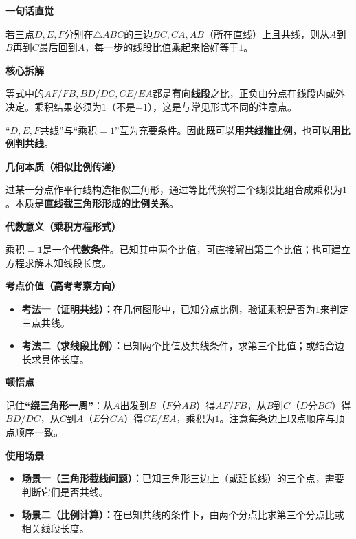 \begin{explanationbox}
	\textbf{\textcolor{CExplanation}{一句话直觉}}

	若三点$D,E,F$分别在$\triangle ABC$的三边$BC,CA,AB$（所在直线）上且共线，则从$A$到$B$再到$C$最后回到$A$，每一步的线段比值乘起来恰好等于$1$。

	\medskip
	\textbf{\textcolor{CExplanation}{核心拆解}}
	\begin{description}[style=nextline, leftmargin=2.8em, labelsep=0.5em, itemsep=0.45em]
		\item[\textbf{要点一（有向比例乘积）：}] 等式中的$AF/FB,BD/DC,CE/EA$都是\textbf{有向线段}之比，正负由分点在线段内或外决定。乘积结果必须为$1$（不是$-1$），这是与常见形式不同的注意点。
		\item[\textbf{要点二（充要关系）：}] “$D,E,F$共线”与“乘积$=1$”互为充要条件。因此既可以\textbf{用共线推比例}，也可以\textbf{用比例判共线}。
	\end{description}

	\medskip
	\textbf{\textcolor{CExplanation}{几何本质（相似比例传递）}}

	过某一分点作平行线构造相似三角形，通过等比代换将三个线段比组合成乘积为$1$。本质是\textbf{直线截三角形形成的比例关系}。

	\medskip
	\textbf{\textcolor{CExplanation}{代数意义（乘积方程形式）}}

	乘积$=1$是一个\textbf{代数条件}。已知其中两个比值，可直接解出第三个比值；也可建立方程求解未知线段长度。

	\medskip
	\textbf{\textcolor{CExplanation}{考点价值（高考考察方向）}}
	\begin{itemize}[leftmargin=*, itemsep=0.5em, topsep=0.4em]
		\item \textbf{考法一（证明共线）：}在几何图形中，已知分点比例，验证乘积是否为$1$来判定三点共线。
		\item \textbf{考法二（求线段比例）：}已知两个比值及共线条件，求第三个比值；或结合边长求具体长度。
	\end{itemize}

	\medskip
	\textbf{\textcolor{CExplanation}{顿悟点}}

	记住\textbf{“绕三角形一周”}：从$A$出发到$B$（$F$分$AB$）得$AF/FB$，从$B$到$C$（$D$分$BC$）得$BD/DC$，从$C$到$A$（$E$分$CA$）得$CE/EA$，乘积为$1$。注意每条边上取点顺序与顶点顺序一致。

	\medskip
	\textbf{\textcolor{CExplanation}{使用场景}}
	\begin{itemize}[leftmargin=*, itemsep=0.5em, topsep=0.4em]
		\item \textbf{场景一（三角形截线问题）：}已知三角形三边上（或延长线）的三个点，需要判断它们是否共线。
		\item \textbf{场景二（比例计算）：}在已知共线的条件下，由两个分点比求第三个分点比或相关线段长度。
	\end{itemize}
\end{explanationbox}
